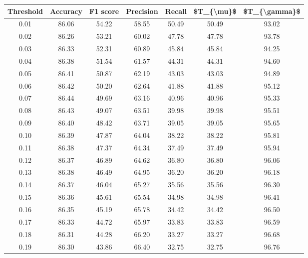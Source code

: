 \begin{tabular}{|c|c|c|c|c|c|c|}
\hline
 Threshold &  Accuracy &  F1 score &  Precision &  Recall &  \$T\_\{\textbackslash mu\}\$ &  \$T\_\{\textbackslash gamma\}\$ \\
\hline
      0.01 &     86.06 &     54.22 &      58.55 &   50.49 &      50.49 &         93.02 \\
      0.02 &     86.26 &     53.21 &      60.02 &   47.78 &      47.78 &         93.78 \\
      0.03 &     86.33 &     52.31 &      60.89 &   45.84 &      45.84 &         94.25 \\
      0.04 &     86.38 &     51.54 &      61.57 &   44.31 &      44.31 &         94.60 \\
      0.05 &     86.41 &     50.87 &      62.19 &   43.03 &      43.03 &         94.89 \\
      0.06 &     86.42 &     50.20 &      62.64 &   41.88 &      41.88 &         95.12 \\
      0.07 &     86.44 &     49.69 &      63.16 &   40.96 &      40.96 &         95.33 \\
      0.08 &     86.43 &     49.07 &      63.51 &   39.98 &      39.98 &         95.51 \\
      0.09 &     86.40 &     48.42 &      63.71 &   39.05 &      39.05 &         95.65 \\
      0.10 &     86.39 &     47.87 &      64.04 &   38.22 &      38.22 &         95.81 \\
      0.11 &     86.38 &     47.37 &      64.34 &   37.49 &      37.49 &         95.94 \\
      0.12 &     86.37 &     46.89 &      64.62 &   36.80 &      36.80 &         96.06 \\
      0.13 &     86.38 &     46.49 &      64.95 &   36.20 &      36.20 &         96.18 \\
      0.14 &     86.37 &     46.04 &      65.27 &   35.56 &      35.56 &         96.30 \\
      0.15 &     86.36 &     45.61 &      65.54 &   34.98 &      34.98 &         96.41 \\
      0.16 &     86.35 &     45.19 &      65.78 &   34.42 &      34.42 &         96.50 \\
      0.17 &     86.33 &     44.72 &      65.97 &   33.83 &      33.83 &         96.59 \\
      0.18 &     86.31 &     44.28 &      66.20 &   33.27 &      33.27 &         96.68 \\
      0.19 &     86.30 &     43.86 &      66.40 &   32.75 &      32.75 &         96.76 \\

\end{tabular}
